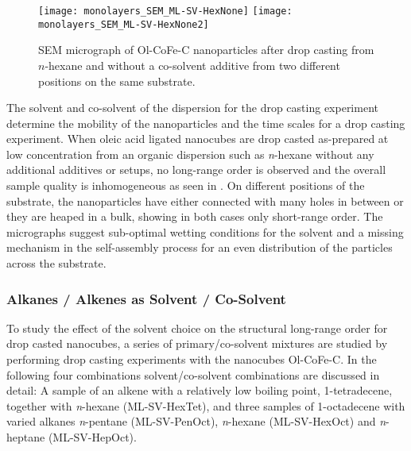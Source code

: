 \documentclass[\main/dresen_thesis.tex]{subfiles}
\begin{document}
  \label{sec:monolayers:preparation:solventProperties}
  \begin{figure}[tb]
    \centering
    \texttt{[image: monolayers\_SEM\_ML-SV-HexNone]}
    \texttt{[image: monolayers\_SEM\_ML-SV-HexNone2]}
    \caption{\label{fig:monolayers:preparation:solventVariation:semNoCoSolvent}SEM micrograph of Ol-CoFe-C nanoparticles after drop casting from $\mathit{n}$-hexane and without a co-solvent additive from two different positions on the same substrate.}
  \end{figure}
  The solvent and co-solvent of the dispersion for the drop casting experiment determine the mobility of the nanoparticles and the time scales for a drop casting experiment.
  When oleic acid ligated nanocubes are drop casted as-prepared at low concentration from an organic dispersion such as \textit{n}-hexane without any additional additives or setups, no long-range order is observed and the overall sample quality is inhomogeneous as seen in .
  On different positions of the substrate, the nanoparticles have either connected with many holes in between or they are heaped in a bulk, showing in both cases only short-range order.
  The micrographs suggest sub-optimal wetting conditions for the solvent and a missing mechanism in the self-assembly process for an even distribution of the particles across the substrate.

  \subsubsection{Alkanes / Alkenes as Solvent / Co-Solvent}
    To study the effect of the solvent choice on the structural long-range order for drop casted nanocubes, a series of  primary/co-solvent mixtures are studied by performing drop casting experiments with the nanocubes Ol-CoFe-C.
    In the following four combinations solvent/co-solvent combinations are discussed in detail: A sample of an alkene with a relatively low boiling point, 1-tetradecene, together with \textit{n}-hexane (ML-SV-HexTet), and three samples of 1-octadecene with varied alkanes \textit{n}-pentane (ML-SV-PenOct), \textit{n}-hexane (ML-SV-HexOct) and \textit{n}-heptane (ML-SV-HepOct).
\end{document}
